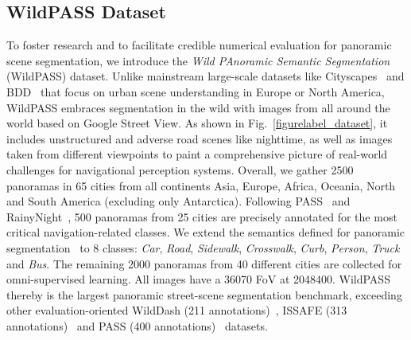 \documentclass[final]{cvpr}
\begin{document}
\subsection{WildPASS Dataset}
\label{sec:wildpass}
To foster research and
to facilitate credible numerical evaluation for panoramic scene segmentation, we introduce the \emph{Wild PAnoramic Semantic Segmentation} (WildPASS) dataset.
Unlike mainstream large-scale datasets like Cityscapes~\cite{cordts2016cityscapes} and BDD~\cite{yu2020bdd100k} that focus on urban scene understanding in Europe or North America, WildPASS embraces segmentation in the wild with images from all around the world based on Google Street View.
As shown in Fig.~\ref{figurelabel_dataset}, it includes unstructured and adverse road scenes like nighttime, as well as images
taken from different viewpoints to paint a comprehensive picture of real-world challenges for navigational perception systems.
Overall, we gather 2500 panoramas in 65 cities from all continents Asia, Europe, Africa, Oceania, North and South America (excluding only Antarctica).
Following PASS~\cite{yang2020pass} and RainyNight~\cite{di2020rainy}, 500 panoramas from 25 cities are precisely annotated for the most critical navigation-related classes.
We extend the semantics defined for panoramic segmentation~\cite{yang2020pass} to 8 classes: \emph{Car}, \emph{Road}, \emph{Sidewalk}, \emph{Crosswalk}, \emph{Curb}, \emph{Person}, \emph{Truck} and \emph{Bus}.
The remaining 2000 panoramas from 40 different cities are collected for omni-supervised learning.
All images have a 36070 FoV at 2048400.
WildPASS thereby is the largest panoramic street-scene segmentation benchmark, exceeding other evaluation-oriented WildDash (211 annotations)~\cite{zendel2018wilddash}, ISSAFE (313 annotations)~\cite{zhang2020issafe} and PASS (400 annotations)~\cite{yang2020pass} datasets.
\end{document}
